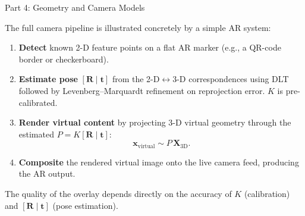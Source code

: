 \documentclass[letterpaper]{article}
\begin{document}
\begin{notes}{Part 4: Geometry and Camera Models}

The full camera pipeline is illustrated concretely by a simple AR system:
\begin{enumerate}[noitemsep]
  \item \textbf{Detect} known 2-D feature points on a flat AR marker
        (e.g., a QR-code border or checkerboard).
  \item \textbf{Estimate pose} $[\mathbf{R}\mid\mathbf{t}]$ from the
        2-D$\leftrightarrow$3-D correspondences using DLT followed by
        Levenberg--Marquardt refinement on reprojection error.  $K$ is
        pre-calibrated.
  \item \textbf{Render virtual content} by projecting 3-D virtual geometry
        through the estimated $P = K[\mathbf{R}\mid\mathbf{t}]$:
        \[
          \mathbf{x}_{\text{virtual}} \sim P\,\mathbf{X}_{\text{3D}}.
        \]
  \item \textbf{Composite} the rendered virtual image onto the live camera
        feed, producing the AR output.
\end{enumerate}
The quality of the overlay depends directly on the accuracy of $K$
(calibration) and $[\mathbf{R}\mid\mathbf{t}]$ (pose estimation).





\end{notes}
\end{document}
